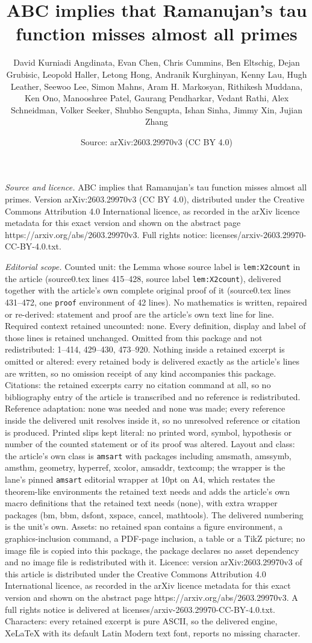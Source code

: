 \documentclass[10pt,a4paper]{amsart}
\title[ABC implies that Ramanujan's tau function misses almost all ]{ABC implies that Ramanujan's tau function misses almost all primes}
\author{David Kurniadi Angdinata, Evan Chen, Chris Cummins, Ben Eltschig, Dejan Grubisic, Leopold Haller, Letong Hong, Andranik Kurghinyan, Kenny Lau, Hugh Leather, Seewoo Lee, Simon Mahns, Aram H. Markosyan, Rithikesh Muddana, Ken Ono, Manooshree Patel, Gaurang Pendharkar, Vedant Rathi, Alex Schneidman, Volker Seeker, Shubho Sengupta, Ishan Sinha, Jimmy Xin, Jujian Zhang}
\date{Source: arXiv:2603.29970v3 (CC BY 4.0)}
\begin{document}
\maketitle

\noindent\emph{Source and licence.} ABC implies that Ramanujan's tau function misses almost all primes. Version arXiv:2603.29970v3 (CC BY 4.0), distributed under the Creative Commons Attribution 4.0 International licence, as recorded in the arXiv licence metadata for this exact version and shown on the abstract page https://arxiv.org/abs/2603.29970v3. Full rights notice: licenses/arxiv-2603.29970-CC-BY-4.0.txt.\par\smallskip

\noindent\textit{Editorial scope.} Counted unit: the Lemma whose source label is \texttt{lem:X2count} in the article (source0.tex lines 415--428, source label \texttt{lem:X2count}), delivered together with the article's own complete original proof of it (source0.tex lines 431--472, one \texttt{proof} environment of 42 lines). No mathematics is written, repaired or re-derived: statement and proof are the article's own text line for line. Required context retained uncounted: none. Every definition, display and label of those lines is retained unchanged. Omitted from this package and not redistributed: 1--414, 429--430, 473--920. Nothing inside a retained excerpt is omitted or altered: every retained body is delivered exactly as the article's lines are written, so no omission receipt of any kind accompanies this package. Citations: the retained excerpts carry no citation command at all, so no bibliography entry of the article is transcribed and no reference is redistributed. Reference adaptation: none was needed and none was made; every reference inside the delivered unit resolves inside it, so no unresolved reference or citation is produced. Printed slips kept literal: no printed word, symbol, hypothesis or number of the counted statement or of its proof was altered. Layout and class: the article's own class is \texttt{amsart} with packages including amsmath, amssymb, amsthm, geometry, hyperref, xcolor, amsaddr, textcomp; the wrapper is the lane's pinned \texttt{amsart} editorial wrapper at 10pt on A4, which restates the theorem-like environments the retained text needs and adds the article's own macro definitions that the retained text needs (none), with extra wrapper packages (bm, bbm, dsfont, xspace, cancel, mathtools). The delivered numbering is the unit's own. Assets: no retained span contains a figure environment, a graphics-inclusion command, a PDF-page inclusion, a table or a TikZ picture; no image file is copied into this package, the package declares no asset dependency and no image file is redistributed with it. Licence: version arXiv:2603.29970v3 of this article is distributed under the Creative Commons Attribution 4.0 International licence, as recorded in the arXiv licence metadata for this exact version and shown on the abstract page https://arxiv.org/abs/2603.29970v3. A full rights notice is delivered at licenses/arxiv-2603.29970-CC-BY-4.0.txt. Characters: every retained excerpt is pure ASCII, so the delivered engine, XeLaTeX with its default Latin Modern text font, reports no missing character.
\end{document}
